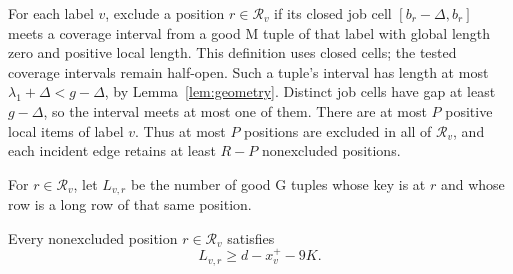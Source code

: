 For each label \(v\), exclude a position \(r\in\mathcal R_v\)
if its closed job cell \([b_r-\Delta,b_r]\) meets a coverage interval
from a good \(\mathrm M\) tuple of that label with global length zero
and positive local length.  This definition uses closed cells;
the tested coverage intervals remain half-open.
Such a tuple's interval has length at most
\(\lambda_1+\Delta<g-\Delta\), by
Lemma~\ref{lem:geometry}.  Distinct job cells have gap at least
\(g-\Delta\), so the interval meets at most one of them.
There are at most \(P\) positive local items of label \(v\).
Thus at most \(P\) positions are excluded in all of
\(\mathcal R_v\), and each incident edge retains at least \(R-P\)
nonexcluded positions.

For \(r\in\mathcal R_v\), let \(L_{v,r}\) be the number of good
\(\mathrm G\) tuples whose key is at \(r\) and whose row is a long
row of that same position.

\begin{lemma}\label{lem:job-matches}
Every nonexcluded position \(r\in\mathcal R_v\) satisfies
\begin{equation}\label{eq:sound-long-matches}
 L_{v,r}\ge d-x_v^+-9K.
\end{equation}
\end{lemma}

